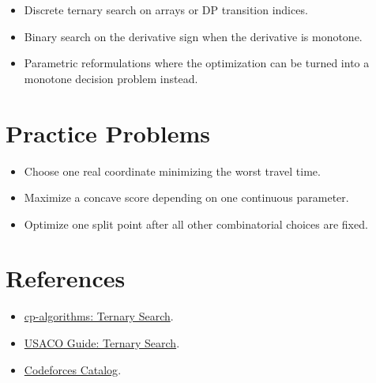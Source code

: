 \begin{itemize}
  \item Discrete ternary search on arrays or DP transition indices.
  \item Binary search on the derivative sign when the derivative is monotone.
  \item Parametric reformulations where the optimization can be turned into a monotone decision problem instead.
\end{itemize}

\section*{Practice Problems}

\begin{itemize}
  \item Choose one real coordinate minimizing the worst travel time.
  \item Maximize a concave score depending on one continuous parameter.
  \item Optimize one split point after all other combinatorial choices are fixed.
\end{itemize}

\section*{References}

\begin{itemize}
  \item \href{https://cp-algorithms.com/num_methods/ternary_search.html}{cp-algorithms: Ternary Search}.
  \item \href{https://usaco.guide/gold/ternary-search}{USACO Guide: Ternary Search}.
  \item \href{https://codeforces.com/catalog}{Codeforces Catalog}.
\end{itemize}
